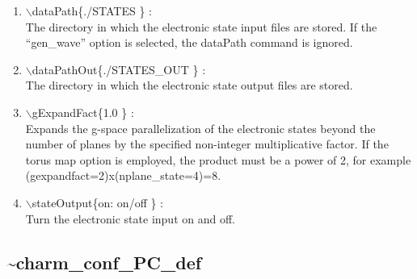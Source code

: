 \documentclass[12pt]{article}
\begin{document}
\begin{enumerate}
  \vspace{0.15in} 
  \item $\backslash$dataPath\{./STATES \} : \\    
  The directory in which the electronic state input files are
  stored. If the ``gen\_wave'' option is selected, the dataPath
  command is ignored.
  \vspace{0.15in} 
  \item $\backslash$dataPathOut\{./STATES\_OUT \} : \\    
  The directory in which the electronic state output files are stored.
  \vspace{0.15in} 
  \item $\backslash$gExpandFact\{1.0 \} : \\    
  Expands the g-space parallelization of the electronic states beyond the number of planes by
  the specified non-integer multiplicative factor. If the torus map option is
  employed, the product must be a power of 2, for example 
 (gexpandfact=2)x(nplane\_state=4)=8.
  \vspace{0.15in} 
  \item $\backslash$stateOutput\{on: on/off \} : \\    
  Turn the electronic state input on and off.
\end{enumerate}

\newpage
\subsection*{\bf \~{ }charm\_conf\_PC\_def}
\end{document}
